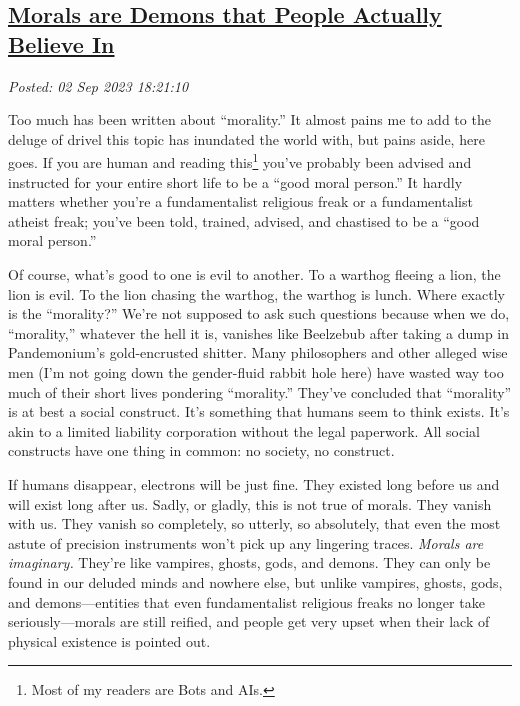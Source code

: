 %

\subsection*{\href{http://analyzethedatanotthedrivel.org/2023/09/02/morals-are-demons-that-people-actually-believe-in/}{Morals are Demons that People Actually Believe In}}


\noindent\emph{Posted: 02 Sep 2023 18:21:10}
\vspace{6pt}

Too much has been written about ``morality.'' It almost pains me to add
to the deluge of drivel this topic has inundated the world with, but
pains aside, here goes. If you are human and reading
this\footnote{Most of my readers are Bots and AIs.
} you've %
probably been advised and instructed for your entire short life
to be a ``good moral person.'' It hardly matters whether you're a
fundamentalist religious freak or a fundamentalist atheist freak; you've
been told, trained, advised, and chastised to be a ``good moral
person.''

Of course, what's good to one is evil to another. To a warthog fleeing a
lion, the lion is evil. To the lion chasing the warthog, the warthog is
lunch. Where exactly is the ``morality?'' We're not supposed to ask such
questions because when we do, ``morality,'' whatever the hell it is,
vanishes like Beelzebub after taking a dump in Pandemonium's
gold-encrusted shitter. Many philosophers and other alleged wise men
(I'm not going down the gender-fluid rabbit hole here) have wasted way
too much of their short lives pondering ``morality.'' They've concluded
that ``morality'' is at best a social construct. It's something that
humans seem to think exists. It's akin to a limited liability
corporation without the legal paperwork. All social constructs have one
thing in common: no society, no construct.

If humans disappear, electrons will be just fine. They existed long
before us and will exist long after us. Sadly, or gladly, this is not
true of morals. They vanish with us. They vanish so completely, so
utterly, so absolutely, that even the most astute of precision
instruments won't pick up any lingering traces. \emph{Morals are
imaginary.} They're like vampires, ghosts, gods, and demons. They can
only be found in our deluded minds and nowhere else, but unlike
vampires, ghosts, gods, and demons---entities that even fundamentalist
religious freaks no longer take seriously---morals are still reified,
and people get very upset when their lack of physical existence is
pointed out.

